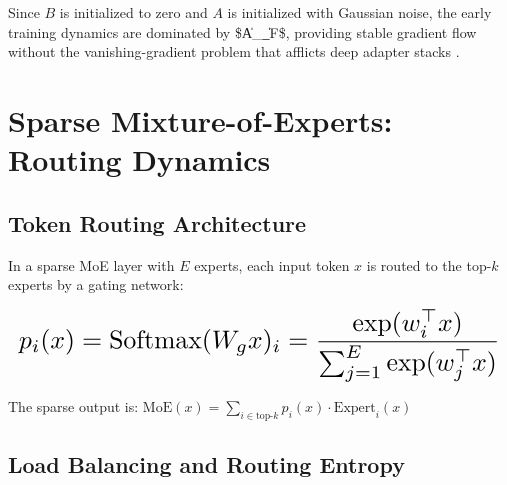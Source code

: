 \documentclass[10pt,journal,compsoc,twocolumn]{IEEEtran}
\begin{document}
Since $B$ is initialized to zero and $A$ is initialized with Gaussian noise, the early training dynamics are dominated by \$\|A\_\ell\|\_F\$, providing stable gradient flow without the vanishing-gradient problem that afflicts deep adapter stacks \cite{arxiv_2305_18290}.




\section{Sparse Mixture-of-Experts: Routing Dynamics}



\subsection{Token Routing Architecture}


In a sparse MoE layer with $E$ experts, each input token $x$ is routed to the top-$k$ experts by a gating network:

























\begin{equation}
\resizebox{\columnwidth}{!}{$\displaystyle
\begin{aligned}
p_i(x) = \text{Softmax}(W_g x)_i = \frac{\exp(w_i^\top x)}{\sum_{j=1}^E \exp(w_j^\top x)}
\end{aligned}
$}
\end{equation}

























The sparse output is: $\text{MoE}(x) = \sum_{i \in \text{top-}k} p_i(x) \cdot \text{Expert}_i(x)$


\subsection{Load Balancing and Routing Entropy}
\end{document}
